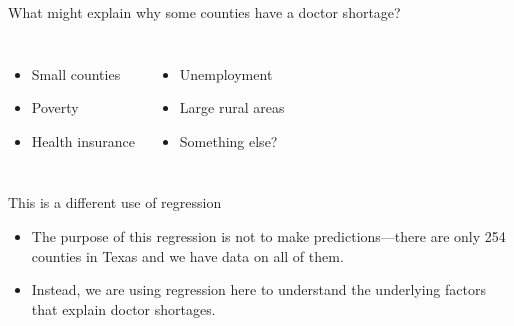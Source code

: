 \documentclass{beamer}\usepackage[]{graphicx}\usepackage[]{color}
\makeatletter
\newcommand{\hlopt}[1]{\textcolor[rgb]{1,0.894,0.769}{#1}}%
\newcommand{\hlstd}[1]{\textcolor[rgb]{1,0.894,0.769}{#1}}%
\newcommand{\hlkwb}[1]{\textcolor[rgb]{0.804,0.776,0.451}{#1}}%
\newcommand{\hlkwc}[1]{\textcolor[rgb]{0.78,0.941,0.545}{#1}}%
\newcommand{\hlkwd}[1]{\textcolor[rgb]{1,0.78,0.769}{#1}}%
\newenvironment{kframe}{%
 \def\at@end@of@kframe{}%
 \ifinner\ifhmode%
  \def\at@end@of@kframe{\end{minipage}}%
  \begin{minipage}{\columnwidth}%
 \fi\fi%
 \def\FrameCommand##1{\hskip\@totalleftmargin \hskip-\fboxsep
 \colorbox{shadecolor}{##1}\hskip-\fboxsep
     \hskip-\linewidth \hskip-\@totalleftmargin \hskip\columnwidth}%
 \MakeFramed {\advance\hsize-\width
   \@totalleftmargin\z@ \linewidth\hsize
   \@setminipage}}%
 {\par\unskip\endMakeFramed%
 \at@end@of@kframe}
\newenvironment{knitrout}{}{} %
\makeatother
\begin{document}
\begin{darkframes}
    \begin{frame}{What might explain why some counties have a doctor shortage?}
      \begin{columns}[onlytextwidth]
          \begin{itemize}
            \item Small counties
            \item Poverty
            \item Health insurance
          \end{itemize}
          \begin{itemize}
            \item Unemployment
            \item Large rural areas
            \item Something else?
          \end{itemize}
      \end{columns}
    \end{frame}

    \begin{frame}{This is a different use of regression}
      \begin{itemize}[<+->]
        \item The purpose of this regression is not to make predictions---there are only 254 counties in Texas and we have data on all of them.
        \item Instead, we are using regression here to \alert{understand the underlying factors} that explain doctor shortages.
      \end{itemize}
    \end{frame}



\end{darkframes}
\end{document}
